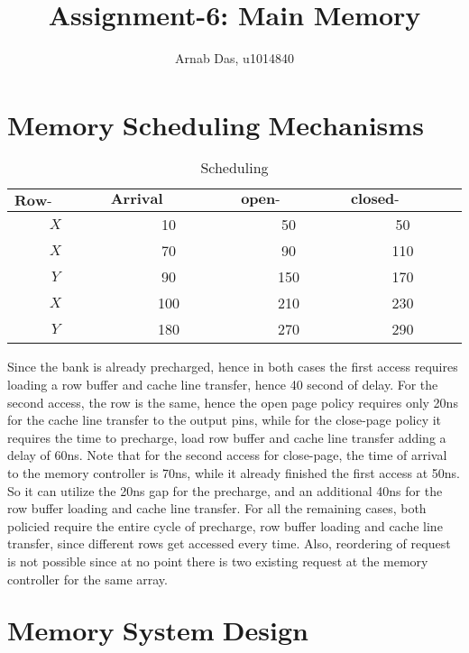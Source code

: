 \documentclass{tufte-handout}
\title{Assignment-6: Main Memory}
\author[]{Arnab Das, u1014840}
\begin{document}
  
  \maketitle%
  

 \setcounter{secnumdepth}{1}

\section{$\textbf{Memory Scheduling Mechanisms}$}
 \begin{table}
 	\centering
	\label{tab:mem-sched}
	\begin{tabular}{c|c|c|c}
	$\textbf{Row-Access}$ & $\textbf{Arrival Time(ns)}$ & $\textbf{open-page(ns)}$ & $\textbf{closed-page(ns)}$ \\
	\midrule
	$X$ & 10 & 50 & 50 \\
	$X$ & 70 & 90 & 110 \\
	$Y$ & 90 & 150 & 170 \\
	$X$ & 100 & 210 & 230 \\
	$Y$ & 180 & 270 & 290 \\
	\bottomrule
	\end{tabular}
	\caption{ Scheduling }
 \end{table}

 Since the bank is already precharged, hence in both cases the first access requires loading a row buffer and cache line transfer, hence 40 second of delay. For the second access, the row is the same, hence the open page policy requires only 20ns for the cache line transfer to the output pins, while for the close-page policy it requires the time to precharge, load row buffer and cache line transfer adding a delay of 60ns. Note that for the second access for close-page, the time of arrival to the memory controller is 70ns, while it already finished the first access at 50ns. So it can utilize the 20ns gap for the precharge, and an additional 40ns for the row buffer loading and cache line transfer. For all the remaining cases, both policied require the entire cycle of precharge, row buffer loading and cache line transfer, since different rows get accessed every time. Also, reordering of request is not possible since at no point there is two existing request at the memory controller for the same array.

 \section{$\textbf{Memory System Design}$}
\end{document}
